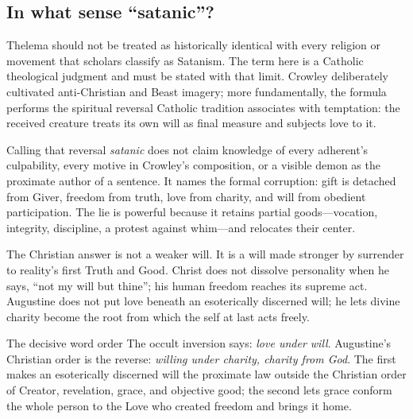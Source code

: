 \subsection{In what sense ``satanic''?}

Thelema should not be treated as historically identical with every religion or movement that scholars classify as Satanism. The term here is a Catholic theological judgment and must be stated with that limit. Crowley deliberately cultivated anti-Christian and Beast imagery; more fundamentally, the formula performs the spiritual reversal Catholic tradition associates with temptation: the received creature treats its own will as final measure and subjects love to it.

Calling that reversal \emph{satanic} does not claim knowledge of every adherent's culpability, every motive in Crowley's composition, or a visible demon as the proximate author of a sentence. It names the formal corruption: gift is detached from Giver, freedom from truth, love from charity, and will from obedient participation. The lie is powerful because it retains partial goods---vocation, integrity, discipline, a protest against whim---and relocates their center.

The Christian answer is not a weaker will. It is a will made stronger by surrender to reality's first Truth and Good. Christ does not dissolve personality when he says, ``not my will but thine''; his human freedom reaches its supreme act. Augustine does not put love beneath an esoterically discerned will; he lets divine charity become the root from which the self at last acts freely.

\begin{studybox}{The decisive word order}
The occult inversion says: \emph{love under will}. Augustine's Christian order is the reverse: \emph{willing under charity, charity from God}. The first makes an esoterically discerned will the proximate law outside the Christian order of Creator, revelation, grace, and objective good; the second lets grace conform the whole person to the Love who created freedom and brings it home.
\end{studybox}
